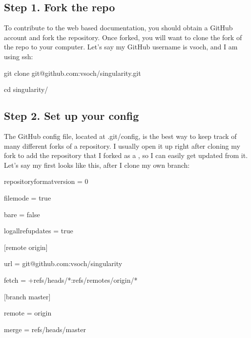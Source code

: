 \documentclass[letterpaper,10pt,english]{sphinxmanual}
\begin{document}
\subsection{Step 1. Fork the repo}
\label{\detokenize{contributing:step-1-fork-the-repo}}
To contribute to the web based documentation, you should obtain a GitHub account and fork the  repository.
Once forked, you will want to clone the fork of the repo to your computer. Let’s say my GitHub username is vsoch, and I am using ssh:

%
\begin{sphinxVerbatim}[commandchars=\\\{\}]
git clone git@github.com:vsoch/singularity.git

cd singularity/
\end{sphinxVerbatim}


\subsection{Step 2. Set up your config}
\label{\detokenize{contributing:step-2-set-up-your-config}}
The GitHub config file, located at .git/config, is the best way to keep track of many different forks of a repository.
I usually open it up right after cloning my fork to add the repository that I forked as a , so I can easily get updated from it.
Let’s say my  first looks like this, after I clone my own branch:

%
\begin{sphinxVerbatim}[commandchars=\\\{\}]
[core]

    repositoryformatversion = 0

    filemode = true

    bare = false

    logallrefupdates = true

[remote \PYGZdq{}origin\PYGZdq{}]

    url = git@github.com:vsoch/singularity

    fetch = +refs/heads/*:refs/remotes/origin/*

[branch \PYGZdq{}master\PYGZdq{}]

    remote = origin

    merge = refs/heads/master
\end{sphinxVerbatim}
\end{document}
